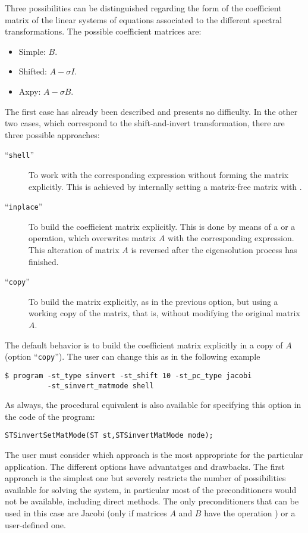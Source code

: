 	Three possibilities can be distinguished regarding the form of the coefficient matrix of the linear systems of equations associated to the different spectral transformations. The possible coefficient matrices are:
	\begin{itemize}
	\item Simple: $B$.
	\item Shifted: $A-\sigma I$.
	\item Axpy: $A-\sigma B$.
	\end{itemize}
	The first case has already been described and presents no difficulty. In the other two cases, which correspond to the shift-and-invert transformation, there are three possible approaches:
	\begin{description}
	\item[``\Verb!shell!''] To work with the corresponding expression without forming the matrix explicitly. This is achieved by internally setting a matrix-free matrix with .
	\item[``\Verb!inplace!''] To build the coefficient matrix explicitly. This is done by means of a  or a  operation, which overwrites matrix $A$ with the corresponding expression. This alteration of matrix $A$ is reversed after the eigensolution process has finished.
	\item[``\Verb!copy!''] To build the matrix explicitly, as in the previous option, but using a working copy of the matrix, that is, without modifying the original matrix $A$. 
	\end{description}
	The default behavior is to build the coefficient matrix explicitly in a copy of $A$ (option ``\Verb!copy!''). The user can change this as in the following example
\begin{Verbatim}[fontsize=\small]
	$ program -st_type sinvert -st_shift 10 -st_pc_type jacobi
		  -st_sinvert_matmode shell
\end{Verbatim}
	As always, the procedural equivalent is also available for specifying this option in the code of the program:
	\begin{Verbatim}[fontsize=\small]
	STSinvertSetMatMode(ST st,STSinvertMatMode mode);
	\end{Verbatim}

	The user must consider which approach is the most appropriate for the particular application. The different options have advantatges and drawbacks. The first approach is the simplest one but severely restricts the number of possibilities available for solving the system, in particular most of the \petsc{} preconditioners would not be available, including direct methods. The only preconditioners that can be used in this case are Jacobi (only if matrices $A$ and $B$ have the operation ) or a user-defined one.
	
